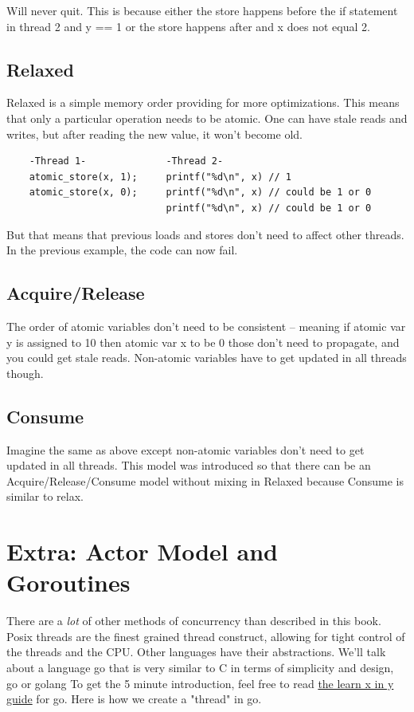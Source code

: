 Will never quit.
This is because either the store happens before the if statement in thread 2 and y == 1 or the store happens after and x does not equal 2.

\subsection{Relaxed}

Relaxed is a simple memory order providing for more optimizations.
This means that only a particular operation needs to be atomic.
One can have stale reads and writes, but after reading the new value, it won't become old.

\begin{verbatim}
    -Thread 1-              -Thread 2-
    atomic_store(x, 1);     printf("%d\n", x) // 1
    atomic_store(x, 0);     printf("%d\n", x) // could be 1 or 0
                            printf("%d\n", x) // could be 1 or 0
\end{verbatim}

But that means that previous loads and stores don't need to affect other threads.
In the previous example, the code can now fail.

\subsection{Acquire/Release}

The order of atomic variables don't need to be consistent -- meaning if atomic var y is assigned to 10 then atomic var x to be 0 those don't need to propagate, and you could get stale reads.
Non-atomic variables have to get updated in all threads though.

\subsection{Consume}

Imagine the same as above except non-atomic variables don't need to get updated in all threads.
This model was introduced so that there can be an Acquire/Release/Consume model without mixing in Relaxed because Consume is similar to relax.

\section{Extra: Actor Model and Goroutines}

There are a \textit{lot} of other methods of concurrency than described in this book.
Posix threads are the finest grained thread construct, allowing for tight control of the threads and the CPU.
Other languages have their abstractions.
We'll talk about a language go that is very similar to C in terms of simplicity and design, go or golang
To get the 5 minute introduction, feel free to read \href{https://learnxinyminutes.com/docs/go/}{the learn x in y guide} for go.
Here is how we create a "thread" in go.

